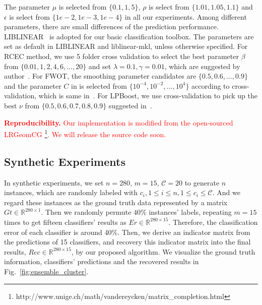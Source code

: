 \documentclass[10pt,twocolumn,letterpaper]{article}
\def\calC{{\mathcal{C}}}
\def\bL{{\bf L}}
\def\dsR{\mathds{R}}
\def\yanred{\textcolor{red}}
\begin{document}
The parameter $\mu$ is selected from $\{0.1, 1, 5\}$,
$\rho$ is select from $\{1.01, 1.05, 1.1\}$
and $\epsilon$ is select from $\{1e-2, 1e-3, 1e-4\}$ in all our experiments.
Among different parameters, there are small differences of the prediction performance.
LIBLINEAR~\cite{fan2008liblinear} is adopted for our basic classification toolbox.
The parameters are set as default in LIBLINEAR and liblinear-mkl, unless otherwise specified.
For RCEC method, we use 5 folder cross validation to select the best parameter $\beta$ from $\{0.01,1,2,4,6,...,20\}$ and set $\lambda = 0.1, \gamma = 0.01$, which are suggested by author~\cite{yiicdm2012robust}.
For FWOT, the smoothing parameter candidates are $\{0.5, 0.6, ... , 0.9\}$ and the parameter $C$ in is selected from $\{10^{-4},10^{-2},...,10^{4}\}$ according to cross-validation, which is same in~\cite{xuiccv2013feature}.
For LPBoost, we use cross-validation to pick up the best $\nu$ from $\{0.5,0.6,0.7,0.8,0.9\}$ suggested in~\cite{xuiccv2013feature}.

\yanred{
\textbf{Reproducibility.}
Our implementation is modified from the open-sourced LRGeomCG
\cite{vandereycken2013lowrank}\footnote{http://www.unige.ch/math/vandereycken/matrix\_completion.html}.
We will release the source code soon.
}

\subsection{Synthetic Experiments}

In synthetic experiments, we set $n = 280$, $m = 15$, $\calC = 20$ to generate $n$ instances, which are randomly labeled with $c_i, 1 \leq i \leq n, 1 \leq c_i \leq \calC$.
And we regard these instances as the ground truth data represented by a matrix $Gt \in \dsR^{280 \times 1}$.
Then we randomly permute $40\%$ instances' labels,
repeating $m = 15$ times to get fifteen classifiers' results as $Er \in \dsR^{280 \times 15}$.
Therefore, the classification error of each classifier is around 40\%.
Then, we derive an indicator matrix from the predictions of 15 classifiers,
and recovery this indicator matrix into the final results, $Rec \in \dsR^{280 \times 15}$, by our proposed algorithm.
We visualize the ground truth information, classifiers' predictions and the recovered results in Fig.~\ref{fig:ensemble_cluster}.
\end{document}
